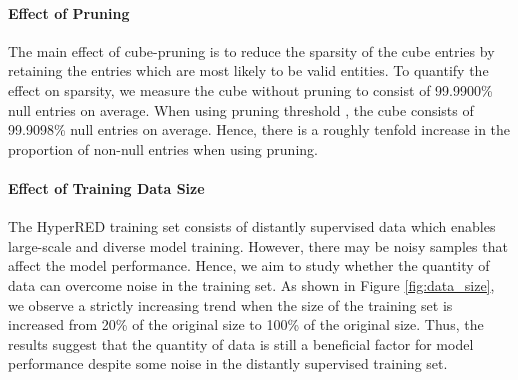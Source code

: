 \documentclass[11pt]{article}
\newcommand{\dataname}{HyperRED}
\begin{document}
\paragraph{Effect of Pruning}
The main effect of cube-pruning is to reduce the sparsity of the cube entries by retaining the entries which are most likely to be valid entities.
To quantify the effect on sparsity, we measure the cube without pruning to consist of 99.9900\% null entries on average.
When using pruning threshold , the cube consists of 99.9098\% null entries on average.
Hence, there is a roughly tenfold increase in the proportion of non-null entries when using pruning.

\paragraph{Effect of Training Data Size}
\label{sec:size}
The \dataname{} training set consists of distantly supervised data which enables large-scale and diverse model training.
However, there may be noisy samples that affect the model performance.
Hence, we aim to study whether the quantity of data can overcome noise in the training set.
As shown in Figure \ref{fig:data_size}, we observe a strictly increasing trend when the size of the training set is increased from 20\% of the original size to 100\% of the original size.
Thus, the results suggest that the quantity of data is still a beneficial factor for model performance despite some noise in the distantly supervised training set.
\end{document}
